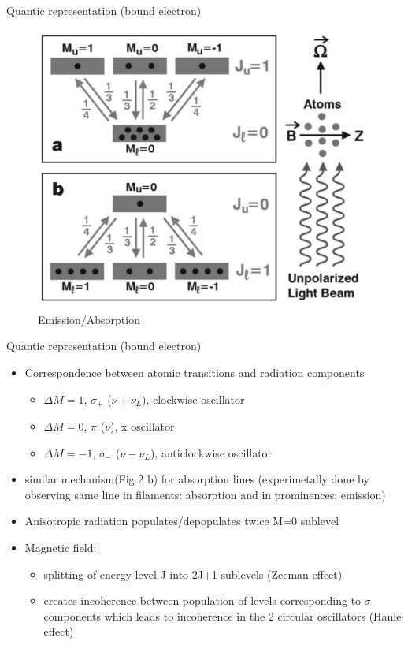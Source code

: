 \documentclass{beamer}
\begin{document}
\begin{frame}{Quantic representation (bound electron)}
\begin{figure}[H]
 \centering
 \includegraphics[scale=0.5]{a1.png}
  \caption{Emission/Absorption}
\end{figure}
\end{frame}

\begin{frame}{Quantic representation (bound electron)}
\begin{itemize}
\item Correspondence between atomic transitions and radiation components
\begin{itemize}
\item $\Delta M = 1$, $\sigma_+$ ($\nu + \nu_L$), clockwise oscillator
\item $\Delta M = 0$, $\pi$ ($\nu$), x oscillator
\item $\Delta M = -1$, $\sigma_-$ ($\nu - \nu_L$), anticlockwise oscillator
\end{itemize}
\item similar mechanism(Fig 2 b)  for absorption lines
(experimetally done by observing same line in filaments: absorption and in prominences: emission)
\item Anisotropic radiation populates/depopulates twice M=0 sublevel
\item Magnetic field:
\begin{itemize}

\item splitting of  energy level J into 2J+1 sublevels (Zeeman effect) 
\item creates incoherence between  population of levels corresponding  to $\sigma$ components which leads to
incoherence in the 2 circular oscillators (Hanle effect)


\end{itemize}
\end{itemize}

\end{frame}
\end{document}
